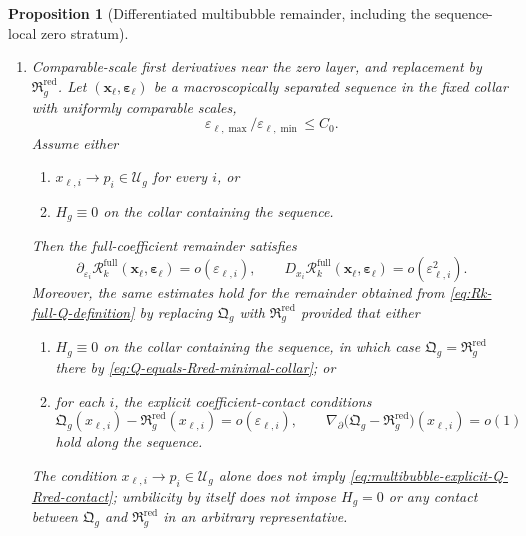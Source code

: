 \documentclass[11pt,reqno,a4paper]{amsart}
\numberwithin{equation}{section}
\theoremstyle{plain}
\newtheorem{proposition}[theorem]{Proposition}
\theoremstyle{remark}
\theoremstyle{plain}
\begin{document}
\begin{proposition}[Differentiated multibubble remainder, including the sequence-local zero stratum]
\begin{enumerate}[label=\textup{(\alph*)},leftmargin=1.5em]
\item \emph{Comparable-scale first derivatives near the zero layer, and replacement by
$\mathfrak R_g^{\mathrm{red}}$.}
Let $(\mathbf x_\ell,\boldsymbol\varepsilon_\ell)$ be a macroscopically separated sequence in the fixed collar with
uniformly comparable scales,
\[
\varepsilon_{\ell,\max}/\varepsilon_{\ell,\min}\le C_0.
\]
Assume either
\begin{enumerate}[label=\textup{(\roman*)},leftmargin=1.5em]
\item $x_{\ell,i}\to p_i\in\mathcal U_g$ for every $i$, or
\item $H_g\equiv0$ on the collar containing the sequence.
\end{enumerate}
Then the full-coefficient remainder satisfies
\begin{equation}\label{eq:seq-local-Rk-derivatives-Q}
\partial_{\varepsilon_i}\mathcal R_k^{\mathrm{full}}
(\mathbf x_\ell,\boldsymbol\varepsilon_\ell)=o(\varepsilon_{\ell,i}),
\qquad
D_{x_i}\mathcal R_k^{\mathrm{full}}
(\mathbf x_\ell,\boldsymbol\varepsilon_\ell)=o(\varepsilon_{\ell,i}^2).
\end{equation}
Moreover, the same estimates hold for the remainder obtained from
\eqref{eq:Rk-full-Q-definition} by replacing $\mathfrak Q_g$ with
$\mathfrak R_g^{\mathrm{red}}$ provided that either
\begin{enumerate}[label=\textup{(\roman*)},leftmargin=1.5em]
\item $H_g\equiv0$ on the collar containing the sequence, in which case
$\mathfrak Q_g=\mathfrak R_g^{\mathrm{red}}$ there by
\eqref{eq:Q-equals-Rred-minimal-collar}; or
\item for each $i$, the explicit coefficient-contact conditions
\begin{equation}\label{eq:multibubble-explicit-Q-Rred-contact}
\mathfrak Q_g(x_{\ell,i})
-
\mathfrak R_g^{\mathrm{red}}(x_{\ell,i})
=
o(\varepsilon_{\ell,i}),
\qquad
\nabla_\partial
\bigl(\mathfrak Q_g-\mathfrak R_g^{\mathrm{red}}\bigr)(x_{\ell,i})
=
o(1)
\end{equation}
hold along the sequence.
\end{enumerate}
The condition $x_{\ell,i}\to p_i\in\mathcal U_g$ alone does not imply
\eqref{eq:multibubble-explicit-Q-Rred-contact}; umbilicity by itself does not
impose $H_g=0$ or any contact between $\mathfrak Q_g$ and
$\mathfrak R_g^{\mathrm{red}}$ in an arbitrary representative.


\end{enumerate}
\end{proposition}
\end{document}
